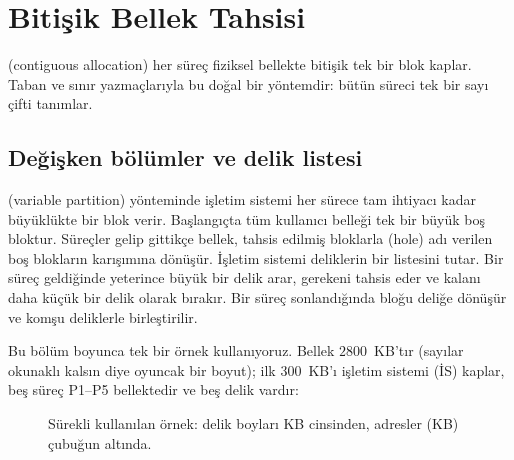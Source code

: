 \section{Bitişik Bellek Tahsisi}
\label{sec:contig}

 (contiguous allocation) her süreç fiziksel bellekte bitişik tek bir blok kaplar. Taban ve sınır yazmaçlarıyla bu doğal bir yöntemdir: bütün süreci tek bir sayı çifti tanımlar.

\subsection{Değişken bölümler ve delik listesi}

 (variable partition) yönteminde işletim sistemi her sürece tam ihtiyacı kadar büyüklükte bir blok verir. Başlangıçta tüm kullanıcı belleği tek bir büyük boş bloktur. Süreçler gelip gittikçe bellek, tahsis edilmiş bloklarla  (hole) adı verilen boş blokların karışımına dönüşür. İşletim sistemi deliklerin bir listesini tutar. Bir süreç geldiğinde yeterince büyük bir delik arar, gerekeni tahsis eder ve kalanı daha küçük bir delik olarak bırakır. Bir süreç sonlandığında bloğu deliğe dönüşür ve komşu deliklerle birleştirilir.

Bu bölüm boyunca tek bir örnek kullanıyoruz. Bellek $2800$~KB'tır (sayılar okunaklı kalsın diye oyuncak bir boyut); ilk $300$~KB'ı işletim sistemi (İS) kaplar, beş süreç P1--P5 bellektedir ve beş delik vardır:

\begin{figure}[H]
\centering
{}
\caption{Sürekli kullanılan örnek: delik boyları KB cinsinden, adresler (KB) çubuğun altında.}
\end{figure}

